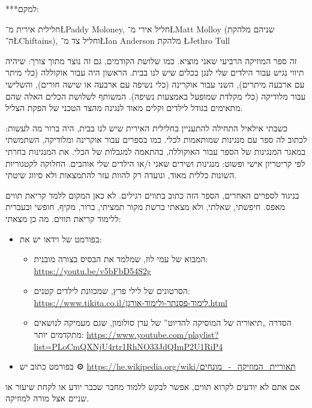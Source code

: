 ***למקם:

חלילית אירית מ־\L{Paddy Moloney}, חליל אירי מ־\L{Matt Molloy} (שניהם מלהקת ה־\L{Chiftains}), וחליל צד מ־\L{Ian Anderson} מלהקת \L{Jethro Tull}



זה ספר המוזיקה הרביעי שאני מוציא. כמו שלושת הקודמים, גם זה נוצר מתוך צורך: שיהיה תיווי נגיש עבור הילדים שלי לנגן בכלים שיש לנו בבית. הראשון היה עבור אוקוללה (כלי מיתר עם ארבעה מיתרים), השני עבור אוקרינה (כלי נשיפה עם ארבעה או שישה חורים), והשלישי עבור מלודיקה (כלי מקלדת שמופעל באמצעות נשיפה). המשותף לשלושת הכלים האלה שהם מתאימים בגודל לילדים וקלים מאוד לנגינה מהצד הטכני של הפקת הצליל.

כשבתי אילאיל התחילה להתעניין בחלילית האירית שיש לנו בבית, היה ברור מה לעשות: לכתוב לה ספר עם מנגינות שמותאמות לכלי. כמו בספרים עבור אוקרינה ומלודיקה, השתמשתי במאגר המנגינות של הספר עבור האוקוללה, בהתאמה למגבלות של הכלי. את המנגינות בחרתי לפי קריטריון אישי ופשוט: מנגינות ושירים שאני ו/או הילדים שלי אוהבים. החלוקה לקטגוריות השונות כללית מאוד, ונועדה רק להוות עזר להתמצאות ולא סיווג שיטתי.



בניגוד לספרים האחרים, הספר הזה כתוב בתווים רגילים. לא כאן המקום ללמד קריאת תווים מאפס. חיפשתי, שאלתי, ולא מצאתי ברשת מקור תמציתי, ברור, מקיף, חופשי ובעברית ללימוד קריאת תווים. מה כן מצאתי:
\begin{itemize}
	\item בפורמט של וידאו יש את:
		\begin{itemize}
			\item המבוא של עמי לוז, שמלמד את הבסיס בצורה מובנית: \url{https://youtu.be/v5bFbD54S2g}
			\item הסרטונים של לילי פרץ, שמכוונת לילדים קטנים: \url{https://www.tikita.co.il/לימוד-פסנתר-ולימוד-אורגן.html}
			\item הסדרה „תיאוריה של המוסיקה להדיוט” של ערן סולומון, שגם מעמיקה לנושאים מתקדמים יותר: \url{https://www.youtube.com/playlist?list=PLoCmQXNjU4rtr1RhNO33JdQImP2U1RiP4}
		\end{itemize}
	\item בפורמט כתוב יש ⚙
		\url{https://he.wikipedia.org/wiki/תאוריית_המוזיקה_-_מונחים}
\end{itemize}

אם אתם לא יודעים לקרוא תווים, אפשר לבקש ללמוד מחבר שכבר יודע או לקחת שיעור או שניים אצל מורה למוזיקה. 




